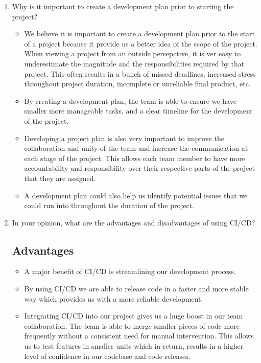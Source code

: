 \documentclass{article}
\begin{document}
\begin{enumerate}
    \item Why is it important to create a development plan prior to starting the
    project?

	\begin{itemize}
		\item We believe it is important to create a development plan prior to the start of
		a project because it provide us a better idea of the scope of the project. When 
		viewing a project from an outside persepctive, it is ver easy to underestimate
		the magnitude and the responsibilities required by that project. This often results
		in a bunch of missed deadlines, increased stress throughout project duration, 
		incomplete or unreliable final product, etc.
		\item By creating a development plan, the team is able to ensure we have smaller 
		more manageable tasks, and a clear timeline for the development of the project.
		\item Developing a project plan is also very important to improve the collaboration
		and unity of the team and increase the communication at each stage of the project.
		This allows each team member to have more accountability and responsibility over
		their respective parts of the project that they are assigned.
		\item A development plan could also help us identify potential issues that we could
		run into throughout the duration of the project.
	\end{itemize}

    \item In your opinion, what are the advantages and disadvantages of using
    CI/CD?
	\subsection*{Advantages}
	\begin{itemize}
		\item A major benefit of CI/CD is streamlining our development process.
		\item By using CI/CD we are able to release code in a faster and more stable way which
		provides us with a more reliable development.
		\item Integrating CI/CD into our project gives us a huge boost in our team collaboration.
		The team is able to merge smaller pieces of code more frequently without a consistent
		need for manual intervention. This allows us to test features in smaller units which in
		return, results in a higher level of confidence in our codebase and code releases.
	\end{itemize}

\end{enumerate}
\end{document}
